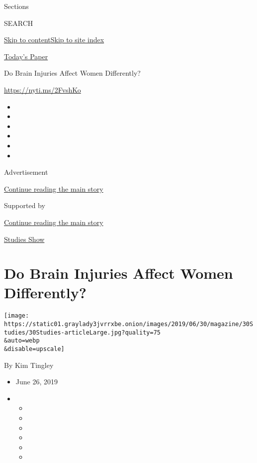 Sections

SEARCH

\protect\hyperlink{site-content}{Skip to
content}\protect\hyperlink{site-index}{Skip to site index}

\href{https://myaccount.nytimes3xbfgragh.onion/auth/login?response_type=cookie\&client_id=vi}{}

\href{https://www.nytimes3xbfgragh.onion/section/todayspaper}{Today's
Paper}

Do Brain Injuries Affect Women Differently?

\url{https://nyti.ms/2FvshKo}

\begin{itemize}
\item
\item
\item
\item
\item
\item
\end{itemize}

Advertisement

\protect\hyperlink{after-top}{Continue reading the main story}

Supported by

\protect\hyperlink{after-sponsor}{Continue reading the main story}

\href{/column/studies-show}{Studies Show}

\hypertarget{do-brain-injuries-affect-women-differently}{%
\section{Do Brain Injuries Affect Women
Differently?}\label{do-brain-injuries-affect-women-differently}}

\texttt{[image: https://static01.graylady3jvrrxbe.onion/images/2019/06/30/magazine/30Studies/30Studies-articleLarge.jpg?quality=75\\\&auto=webp\\\&disable=upscale]}

By Kim Tingley

\begin{itemize}
\item
  June 26, 2019
\item
  \begin{itemize}
  \item
  \item
  \item
  \item
  \item
  \item
  \end{itemize}
\end{itemize}


